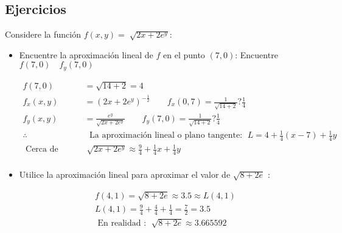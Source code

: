 \subsection{Ejercicios}
Considere la función $f(x,y)=\sqrt[]{2x+2e^y}$: 
\begin{itemize}
    \item Encuentre la aproximación lineal de $f$ en el punto $(7,0)$: \newline Encuentre $f(7,0) \quad f_y(7,0)$
        \begin{center}
           \begin{align*}
               f(7,0)&= \sqrt{14+2} = 4 \\ 
               f_x(x,y)&= (2x+2e^y)^{-\frac{1}{2} } \quad \quad f_x(0,7)= \frac{1}{\sqrt{14+2}} ? \frac{1}{4} \\ 
               f_y(x,y) &= \frac{e^y}{\sqrt{2x+2e^y}} \quad \quad f_y(7,0) = \frac{1}{\sqrt{14+2}} ? \frac{1}{4} \\ 
               \therefore &\; \text{  La aproximación lineal o plano tangente:   }\; L= 4+\frac{1}{4} (x-7) + \frac{1}{4} y \\ 
               \text{  Cerca de (7,0): }\; &\sqrt[]{2x+2e^y} \approx \frac{9}{4} + \frac{1}{4} x + \frac{1}{4} y \\ 
           \end{align*}
        \end{center}
    
    \item Utilice la aproximación lineal para aproximar el valor de $\sqrt{8+2e}$ : 
        \begin{center}
           \begin{align*}
               f(4,1) = \sqrt{8+2e} \approx 3.5 \approx L(4,1) \\ 
               L(4,1) = \frac{9}{4} + \frac{4}{4} + \frac{1}{4} = \frac{7}{2} = 3.5 \\ 
               \text{  En realidad  : }\; \sqrt{8+2e} \approx 3.665592 \\ 
           \end{align*}
        \end{center}
    

\end{itemize}
